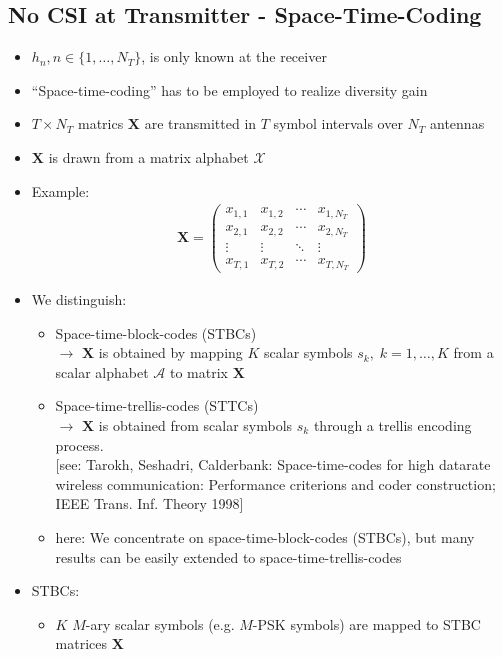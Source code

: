 \documentclass[a4paper, 10pt]{article}
\begin{document}
\subsection{No CSI at Transmitter - Space-Time-Coding}
\begin{itemize}
	\item $h_n, n\in\{1,\dots ,N_T\}$, is only known at the receiver
	\item ``Space-time-coding'' has to be employed to realize diversity gain
	\item $T\times N_T$ matrics $\mathbf{X}$ are transmitted in $T$ symbol intervals over $N_T$ antennas
	\item $\mathbf{X}$ is drawn from a matrix alphabet $\mathcal{X}$
	\item Example:
	\begin{align*}
		\mathbf{X}=\begin{pmatrix} x_{1,1} & x_{1,2} & \cdots & x_{1,N_T} \\
					   x_{2,1} & x_{2,2} & \cdots & x_{2,N_T} \\
					   \vdots  & \vdots  & \ddots & \vdots    \\
				 	   x_{T,1} & x_{T,2} & \cdots & x_{T,N_T}
			\end{pmatrix}
	\end{align*}
	\item We distinguish:
		\begin{itemize}
			\item Space-time-block-codes (STBCs)\\
			$\rightarrow$ $\mathbf{X}$ is obtained by mapping $K$ scalar symbols $s_k,\; k=1, \dots , K$ from a scalar alphabet $\mathcal{A}$ to matrix $\mathbf{X}$
			\item Space-time-trellis-codes (STTCs)\\
			$\rightarrow$ $\mathbf{X}$ is obtained from scalar symbols $s_k$ through a trellis encoding process.\\
			{\small[see: Tarokh, Seshadri, Calderbank: Space-time-codes for high datarate wireless communication: Performance criterions and coder construction; IEEE Trans. Inf. Theory 1998]}
			\item here: We concentrate on space-time-block-codes (STBCs), but many results can be easily extended to space-time-trellis-codes
		\end{itemize}
	\item STBCs:
		\begin{itemize}
			\item  $K$ $M$-ary scalar symbols (e.g. $M$-PSK symbols) are mapped to STBC matrices $\mathbf{X}$\\ 

\end{itemize}
\end{itemize}
\end{document}
